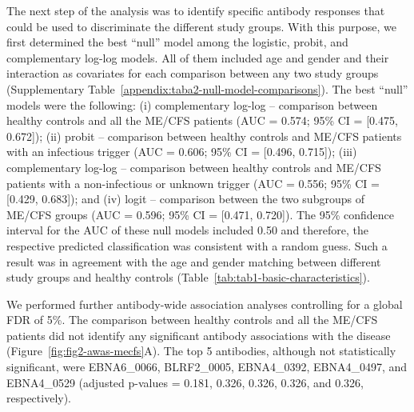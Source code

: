 The next step of the analysis was to identify specific antibody responses that could be used to discriminate the different study groups. With this purpose, we first determined the best ``null'' model among the logistic, probit, and complementary log-log models. All of them included age and gender and their interaction as covariates for each comparison between any two study groups (Supplementary Table~\ref{appendix:taba2-null-model-comparisons}). The best ``null'' models were the following: (i) complementary log-log -- comparison between healthy controls and all the ME/CFS patients (AUC = 0.574; 95\% CI = [0.475, 0.672]); (ii) probit -- comparison between healthy controls and ME/CFS patients with an infectious trigger (AUC = 0.606; 95\% CI = [0.496, 0.715]); (iii) complementary log-log -- comparison between healthy controls and ME/CFS patients with a non-infectious or unknown trigger (AUC = 0.556; 95\% CI = [0.429, 0.683]); and (iv) logit -- comparison between the two subgroups of ME/CFS groups (AUC = 0.596; 95\% CI = [0.471, 0.720]). The 95\% confidence interval for the AUC of these null models included 0.50 and therefore, the respective predicted classification was consistent with a random guess. Such a result was in agreement with the age and gender matching between different study groups and healthy controls (Table~\ref{tab:tab1-basic-characteristics}).


We performed further antibody-wide association analyses controlling for a global FDR of 5\%. The comparison between healthy controls and all the ME/CFS patients did not identify any significant antibody associations with the disease (Figure~\ref{fig:fig2-awas-mecfs}A). The top 5 antibodies, although not statistically significant, were EBNA6\_0066, BLRF2\_0005, EBNA4\_0392, EBNA4\_0497, and EBNA4\_0529 (adjusted p-values = 0.181, 0.326, 0.326, 0.326, and 0.326, respectively).

